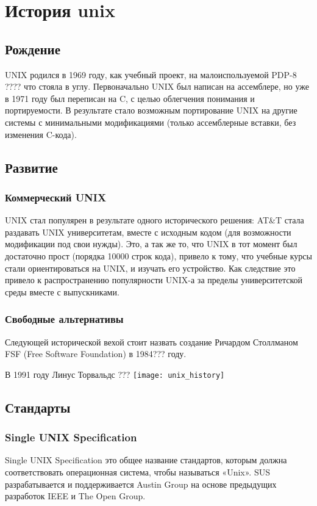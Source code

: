 \chapter {История unix}
\section {Рождение}
UNIX родился в 1969 году, как учебный проект, на малоиспользуемой PDP-8 ???? что стояла в углу.
Первоначально UNIX был написан на ассемблере, но уже в 1971 году был переписан на C, с целью облегчения понимания и портируемости. В результате стало возможным портирование UNIX на другие системы с минимальными модификациями (только ассемблерные вставки, без изменения C-кода).
\section {Развитие}
\subsection {Коммерческий UNIX}
UNIX стал популярен в результате одного исторического решения: AT\&T стала раздавать UNIX университетам, вместе с исходным кодом (для возможности модификации под свои нужды). Это, а так же то, что UNIX в тот момент был достаточно прост (порядка 10000 строк кода), привело к тому, что учебные курсы стали ориентироваться на UNIX, и изучать его устройство. Как следствие это привело к распространению популярности UNIX-а за пределы университетской среды вместе с выпускниками.
\subsection {Свободные альтернативы}
Следующей исторической вехой стоит назвать создание Ричардом Столлманом FSF (Free Software Foundation) в 1984??? году. 

В 1991 году Линус Торвальдс ???
\texttt{[image: unix\_history]}
\section {Стандарты}
\subsection {Single UNIX Specification}
Single UNIX Specification это общее название стандартов, которым должна соответствовать операционная система, чтобы называться «Unix». SUS разрабатывается и поддерживается Austin Group на основе предыдущих разработок IEEE и The Open Group.

